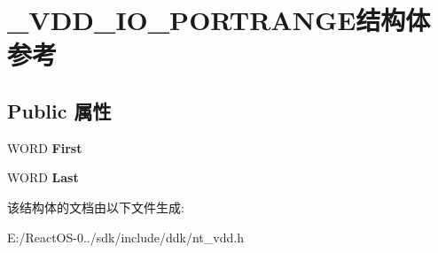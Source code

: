 \hypertarget{struct___v_d_d___i_o___p_o_r_t_r_a_n_g_e}{}\section{\+\_\+\+V\+D\+D\+\_\+\+I\+O\+\_\+\+P\+O\+R\+T\+R\+A\+N\+G\+E结构体 参考}
\label{struct___v_d_d___i_o___p_o_r_t_r_a_n_g_e}
\subsection*{Public 属性}
\begin{DoxyCompactItemize}
\item 
\mbox{\label{struct___v_d_d___i_o___p_o_r_t_r_a_n_g_e_a5ad601ec0ce42eff39d276fb1d789536}} 
W\+O\+RD {\bfseries First}
\item 
\mbox{\label{struct___v_d_d___i_o___p_o_r_t_r_a_n_g_e_a0b46ae45ed5aaa9f711aa7ccbf3551a6}} 
W\+O\+RD {\bfseries Last}
\end{DoxyCompactItemize}


该结构体的文档由以下文件生成\+:\begin{DoxyCompactItemize}
\item 
E\+:/\+React\+O\+S-\/0../sdk/include/ddk/nt\+\_\+vdd.\+h\end{DoxyCompactItemize}
